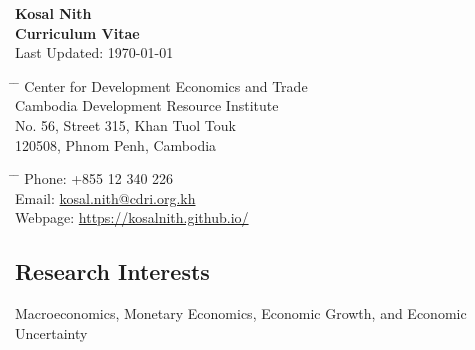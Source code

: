 \documentclass[10pt,a4paper]{article}
\begin{document}

\begin{center}
	\Large{\textbf{Kosal Nith}}\\
	\large{\textbf{Curriculum Vitae}\\
	\normalsize Last Updated:	\today}
\end{center}

\parbox{0.5\textwidth}{ %
	\begin{tabbing} %
		\hspace{3cm} \= \hspace{4cm} \= \kill %
		Center for Development Economics and Trade \\
		Cambodia Development Resource Institute\\ 
		No. 56, Street 315, Khan Tuol Touk \\
		120508, Phnom Penh, Cambodia
		
		
\end{tabbing}}
\hfill %
\parbox{0.5\textwidth}{ %
	\begin{tabbing} %
		\hspace{3cm} \= \hspace{4cm} \= \kill %
		Phone: +855 12 340 226 \\ 
		Email: \href{mailto:kosal.nith@cdri.org.kh}{kosal.nith@cdri.org.kh}\\
		Webpage: \href{https://kosalnith.github.io/}{https://kosalnith.github.io/}  
\end{tabbing}}
\vspace{-1em}

\subsection*{Research Interests}	

	Macroeconomics, Monetary Economics, Economic Growth, and Economic Uncertainty
\end{document}
